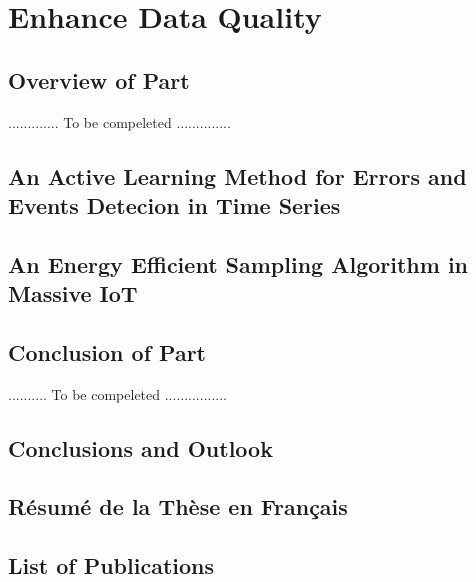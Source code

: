 \documentclass[a4paper,10pt,twoside]{ThesisStyle}
\begin{document}
\part{Enhance Data Quality}
\label{pa:part3}
\chapter*{Overview of Part \ref{pa:part3}}
............. To be compeleted ..............

\chapter{An Active Learning Method for Errors and Events Detecion in Time Series} \label{ch:CABD}


\chapter{An Energy Efficient Sampling Algorithm in Massive IoT} \label{ch:smart_freq}

\chapter*{Conclusion of Part \ref{pa:part3}}
.......... To be compeleted ................


{}
\clearpage{}
\chapter{Conclusions and Outlook}
\label{ch:CFP}


\appendix
\chapter{R\'{e}sum\'{e} de la Th\`{e}se en Fran\c{c}ais}

\chapter{List of Publications}
\label{publication}



%
%


\printindex
\end{document}
